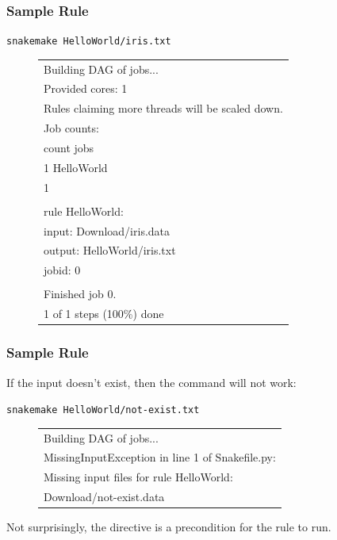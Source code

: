 \begin{frame}[fragile]

\frametitle{Sample Rule}

{\magenta{\$  }}  {\texttt{snakemake HelloWorld/iris.txt}}
{\tiny{
\begin{figure}
  \centering
  \begin{tabular}{l}
Building DAG of jobs... \\
Provided cores: 1 \\
Rules claiming more threads will be scaled down. \\
Job counts: \\
	count	jobs \\
	1	HelloWorld \\
	1 \\
 \\
rule HelloWorld: \\
    input: Download/iris.data \\
    output: HelloWorld/iris.txt \\
    jobid: 0 \\
 \\
Finished job 0. \\
1 of 1 steps (100\%) done \\
  \end{tabular}
\end{figure}
}}

\end{frame}


\begin{frame}[fragile]

\frametitle{Sample Rule}

If the input doesn't exist, then the command will not work:
\vs

{\magenta{\$  }}  {\texttt{snakemake HelloWorld/not-exist.txt}}
\begin{figure}
  \centering
  \begin{tabular}{l}
Building DAG of jobs... \\
MissingInputException in line 1 of Snakefile.py: \\
Missing input files for rule HelloWorld: \\
Download/not-exist.data \\
  \end{tabular}
\end{figure}

Not surprisingly, the {} directive is a precondition for the rule to run.

\end{frame}


